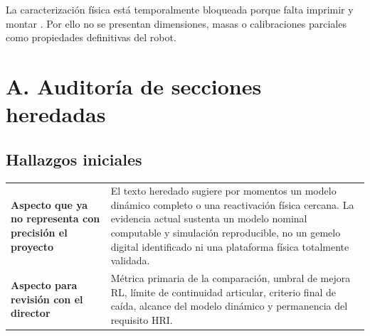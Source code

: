 \documentclass[11pt,letterpaper]{article}
\begin{document}
La caracterización física está temporalmente bloqueada porque falta imprimir y
montar . Por ello no se presentan dimensiones,
masas o calibraciones parciales como propiedades definitivas del robot.

\section{A. Auditoría de secciones heredadas}

\subsection{Hallazgos iniciales}

\begin{tabularx}{\textwidth}{>{\bfseries}p{3.5cm}X}
\toprule
Aspecto que ya no representa con precisión el proyecto & El texto heredado sugiere por momentos un modelo dinámico completo o una reactivación física cercana. La evidencia actual sustenta un modelo nominal computable y simulación reproducible, no un gemelo digital identificado ni una plataforma física totalmente validada.\\
Aspecto para revisión con el director & Métrica primaria de la comparación, umbral de mejora RL, límite de continuidad articular, criterio final de caída, alcance del modelo dinámico y permanencia del requisito HRI.\\
\bottomrule
\end{tabularx}
\end{document}
